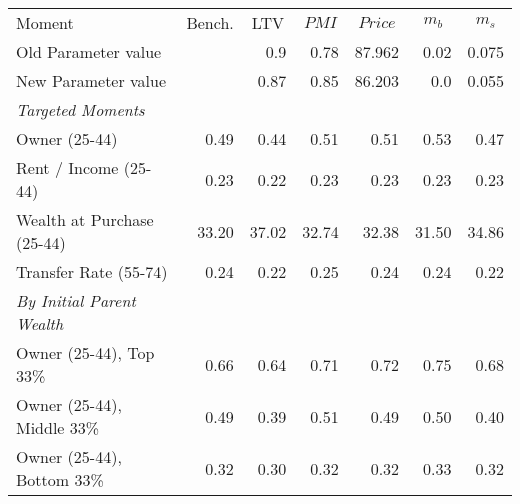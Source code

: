 \begin{tabular}{l rrrrrr}
\toprule
Moment & \multicolumn{1}{c}{Bench.} & \multicolumn{1}{c}{LTV} & \multicolumn{1}{c}{$PMI$} & \multicolumn{1}{c}{$Price$} & \multicolumn{1}{c}{$m_b$ } & \multicolumn{1}{c}{$m_s$}\\
\; Old Parameter value &  & 0.9 & 0.78 & 87.962 & 0.02 & 0.075 \\ 
\; New Parameter value &  & 0.87 & 0.85 & 86.203 & 0.0 & 0.055 \\ 
\midrule
\textit{Targeted Moments} &  &  &  &  &  & \\
\;Owner (25-44) & 0.49 & 0.44 & 0.51 & 0.51 & 0.53 & 0.47\\
\;Rent / Income (25-44) & 0.23 & 0.22 & 0.23 & 0.23 & 0.23 & 0.23\\
\;Wealth at Purchase (25-44) & 33.20 & 37.02 & 32.74 & 32.38 & 31.50 & 34.86\\
\;Transfer Rate (55-74) & 0.24 & 0.22 & 0.25 & 0.24 & 0.24 & 0.22\\
\textit{By Initial Parent Wealth} &  &  &  &  &  & \\
\;Owner (25-44), Top 33\% & 0.66 & 0.64 & 0.71 & 0.72 & 0.75 & 0.68\\
\;Owner (25-44), Middle 33\% & 0.49 & 0.39 & 0.51 & 0.49 & 0.50 & 0.40\\
\;Owner (25-44), Bottom 33\% & 0.32 & 0.30 & 0.32 & 0.32 & 0.33 & 0.32\\
\bottomrule
\end{tabular}
